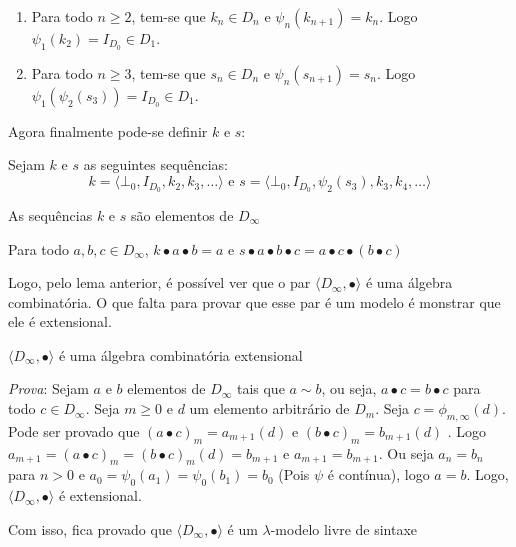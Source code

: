 \documentclass[../main.tex]{subfiles}
\begin{document}
\begin{lemma}
    \hfill
    \begin{enumerate}
        \item Para todo $n \geq 2$, tem-se que $k_n \in D_n$ e $\psi_n (k_{n+1}) = k_n$. Logo $\psi_1 (k_2) = I_{D_0} \in D_1$.
        \item Para todo $n \geq 3$, tem-se que $s_n \in D_n$ e $\psi_n (s_{n+1}) = s_n$. Logo $\psi_1 (\psi_2 (s_3)) = I_{D_0} \in D_1$.
    \end{enumerate}
\end{lemma}

Agora finalmente pode-se definir $k$ e $s$:

\begin{definition}
    Sejam $k$ e $s$ as seguintes sequências: $$k = \langle \bot_0, I_{D_0}, k_2, k_3, \dots \rangle \text{ e } s = \langle \bot_0, I_{D_0}, \psi_2(s_3), k_3, k_4, \dots \rangle$$
\end{definition}

\begin{lemma}
    As sequências $k$ e $s$ são elementos de $D_{\infty}$
\end{lemma}

\begin{lemma}
    Para todo $a, b, c \in D_{\infty}$, $k \bullet a \bullet b = a$ e $s \bullet a \bullet b \bullet c = a \bullet c \bullet (b \bullet c)$
\end{lemma}

Logo, pelo lema anterior, é possível ver que o par $\langle D_{\infty}, \bullet \rangle$ é uma álgebra combinatória. O que falta para provar que esse par é um modelo é monstrar que ele é extensional.

\begin{lemma}
    $\langle D_{\infty}, \bullet \rangle$ é uma álgebra combinatória extensional
\end{lemma}

\emph{Prova}: Sejam $a$ e $b$ elementos de $D_{\infty}$ tais que $a \sim b$, ou seja, $a \bullet c = b \bullet c$ para todo $c \in D_{\infty}$. Seja $m \geq 0$ e $d$ um elemento arbitrário de $D_{m}$. Seja $c = \phi_{m, \infty} (d)$. Pode ser provado que $(a \bullet c)_m = a_{m + 1} (d)$ e $(b \bullet c)_m = b_{m + 1} (d)$ . Logo $ a_{m + 1} = (a \bullet c)_m = (b \bullet c)_m(d) = b_{m+1}$ e $a_{m+1} = b_{m + 1}$. Ou seja $a_n = b_n$ para $n > 0$ e $a_0 = \psi_0(a_1) = \psi_0(b_1) = b_0$ (Pois $\psi$ é contínua), logo $a = b$. Logo, $\langle D_{\infty}, \bullet \rangle$ é extensional.

Com isso, fica provado que $\langle D_{\infty}, \bullet \rangle$ é um $\lambda$-modelo livre de sintaxe
\end{document}

